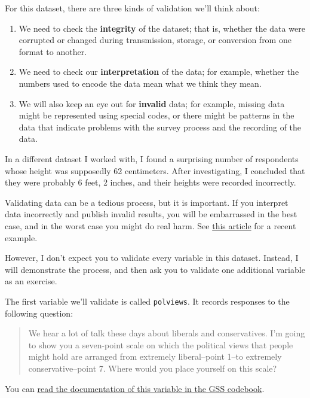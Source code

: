 For this dataset, there are three kinds of validation we'll think about:

\begin{enumerate}
\def\labelenumi{\arabic{enumi})}
\item
  We need to check the \textbf{integrity} of the dataset; that is,
  whether the data were corrupted or changed during transmission,
  storage, or conversion from one format to another.
\item
  We need to check our \textbf{interpretation} of the data; for example,
  whether the numbers used to encode the data mean what we think they
  mean.
\item
  We will also keep an eye out for \textbf{invalid} data; for example,
  missing data might be represented using special codes, or there might
  be patterns in the data that indicate problems with the survey process
  and the recording of the data.
\end{enumerate}

In a different dataset I worked with, I found a surprising number of
respondents whose height was supposedly 62 centimeters. After
investigating, I concluded that they were probably 6 feet, 2 inches, and
their heights were recorded incorrectly.

Validating data can be a tedious process, but it is important. If you
interpret data incorrectly and publish invalid results, you will be
embarrassed in the best case, and in the worst case you might do real
harm. See
\href{https://www.vox.com/future-perfect/2019/6/4/18650969/married-women-miserable-fake-paul-dolan-happiness}{this
article} for a recent example.

However, I don't expect you to validate every variable in this dataset.
Instead, I will demonstrate the process, and then ask you to validate
one additional variable as an exercise.

The first variable we'll validate is called
\passthrough{\lstinline!polviews!}. It records responses to the
following question:

\begin{quote}
We hear a lot of talk these days about liberals and conservatives. I'm
going to show you a seven-point scale on which the political views that
people might hold are arranged from extremely liberal--point 1--to
extremely conservative--point 7. Where would you place yourself on this
scale?
\end{quote}

You can
\href{https://gssdataexplorer.norc.org/projects/52787/variables/178/vshow}{read
the documentation of this variable in the GSS codebook}.

